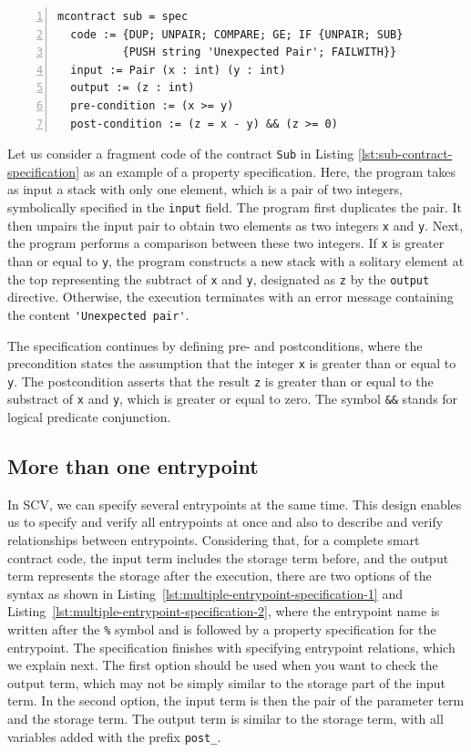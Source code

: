\documentclass[a4paper,USenglish,cleveref, autoref, thm-restate]{lipics-v2021}
\begin{document}
\begin{lstlisting}[float,captionpos=b,caption={Specification of Sub contract},label={lst:sub-contract-specification},numbers=left]
mcontract sub = spec
  code := {DUP; UNPAIR; COMPARE; GE; IF {UNPAIR; SUB} 
          {PUSH string 'Unexpected Pair'; FAILWITH}}
  input := Pair (x : int) (y : int)
  output := (z : int)
  pre-condition := (x >= y)
  post-condition := (z = x - y) && (z >= 0)
\end{lstlisting}

Let us consider a fragment code of the contract \texttt{Sub}  in Listing
\ref{lst:sub-contract-specification} as an example of a property
specification.  Here, the program takes as input a stack with only one
element, which is a pair of two integers, symbolically specified in
the \lstinline|input| field. The program first duplicates the pair. It then unpairs the input pair to obtain two elements as two integers \lstinline/x/ and \lstinline/y/.
Next, the program performs a comparison between
these two integers. If \lstinline/x/ is greater than or equal to
\lstinline/y/, the program constructs a new stack with a solitary
element at the top representing the subtract of  \lstinline/x/ and
\lstinline/y/, designated as \lstinline/z/ by the \lstinline|output| directive. Otherwise, the execution
terminates with an error message containing the content
\lstinline|'Unexpected pair'|.

The specification continues by defining
pre- and postconditions, where the precondition states the assumption
that the integer \lstinline/x/ is greater than or equal to  \lstinline/y/. The postcondition asserts that the result
\lstinline/z/ is greater than or equal to the substract of \lstinline/x/ and \lstinline/y/, which is greater or equal to zero. The symbol \lstinline/&&/ stands for logical predicate conjunction.

\subsection{More than one entrypoint}
\label{sec:more-than-one}
In SCV, we can specify several entrypoints at the same
time. This design enables us to specify and verify all entrypoints
at once and also to describe and verify relationships between
entrypoints.  Considering that, for a complete smart contract code, the input term includes the storage term before, and the output term represents the storage after the execution, there are two options of the syntax as shown in Listing~\ref {lst:multiple-entrypoint-specification-1} and Listing~\ref {lst:multiple-entrypoint-specification-2},
where the entrypoint name is written after the \lstinline/%/ symbol
and is followed by a property specification for the entrypoint. The
specification finishes with specifying entrypoint relations,
which we explain next.  The first option should be used when you want to check the output term, which may not be simply similar to the storage part of the input term. In the second option, the input term is then the pair of the parameter term and the storage term. The output term is similar to the storage term, with all variables added with the prefix \lstinline/post_/.
\end{document}
